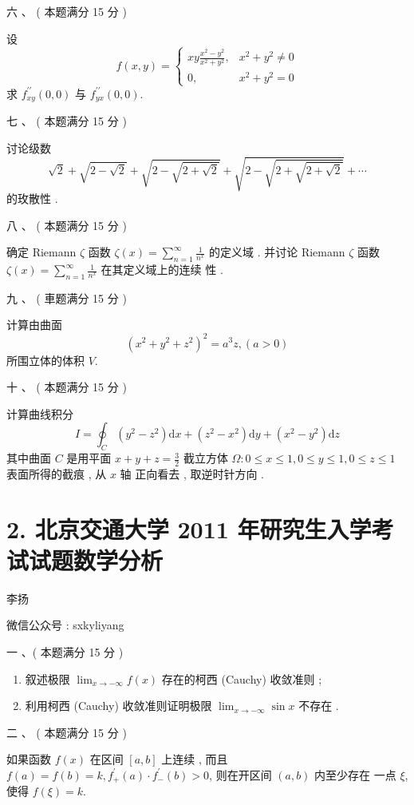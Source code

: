\documentclass[10pt]{article}
\begin{document}
{ 六 、 ( 本题满分  15  分 )

 设 
$$
f(x, y)= \begin{cases}x y \frac{x^{2}-y^{2}}{x^{2}+y^{2}}, & x^{2}+y^{2} \neq 0 \\ 0, & x^{2}+y^{2}=0\end{cases}
$$
 求  $f_{x y}^{\prime \prime}(0,0)$  与  $f_{y x}^{\prime \prime}(0,0)$.

 七 、 ( 本题满分  15  分 )

 讨论级数 
$$
\sqrt{2}+\sqrt{2-\sqrt{2}}+\sqrt{2-\sqrt{2+\sqrt{2}}}+\sqrt{2-\sqrt{2+\sqrt{2+\sqrt{2}}}}+\cdots
$$
 的玫散性 .

 八 、 ( 本题满分  15  分 )

 确定  Riemann $\zeta$  函数  $\zeta(x)=\sum_{n=1}^{\infty} \frac{1}{n^{x}}$  的定义域 .  并讨论  Riemann $\zeta$  函数  $\zeta(x)=\sum_{n=1}^{\infty} \frac{1}{n^{x}}$  在其定义域上的连续   性 .

 九 、 ( 車题满分  15  分 )

 计算由曲面 
$$
\left(x^{2}+y^{2}+z^{2}\right)^{2}=a^{3} z,(a>0)
$$
 所围立体的体积  $V$.

 十 、 ( 本题满分  15  分 )

 计算曲线积分 
$$
I=\oint_{C}\left(y^{2}-z^{2}\right) \mathrm{d} x+\left(z^{2}-x^{2}\right) \mathrm{d} y+\left(x^{2}-y^{2}\right) \mathrm{d} z
$$
 其中曲面  $C$  是用平面  $x+y+z=\frac{3}{2}$  截立方体  $\Omega: 0 \leqslant x \leqslant 1,0 \leqslant y \leqslant 1,0 \leqslant z \leqslant 1$  表面所得的截痕 ,  从  $x$  轴   正向看去 ,  取逆时针方向 .

\section{2. 北京交通大学 2011 年研究生入学考试试题数学分析}
 李扬 

 微信公众号 : sxkyliyang

 一 、( 本题满分  15  分 )

\begin{enumerate}
  \item  叙述极限  $\lim _{x \rightarrow-\infty} f(x)$  存在的柯西  (Cauchy)  收敛准则 ;

  \item  利用柯西  (Cauchy)  收敛准则证明极限  $\lim _{x \rightarrow-\infty} \sin x$  不存在 .

\end{enumerate}
 二 、 ( 本题满分  15  分 )

 如果函数  $f(x)$  在区间  $[a, b]$  上连续 ,  而且  $f(a)=f(b)=k, f_{+}^{\prime}(a) \cdot f_{-}^{\prime}(b)>0$,  则在开区间  $(a, b)$  内至少存在   一点  $\xi$,  使得  $f(\xi)=k$.

}
\end{document}

